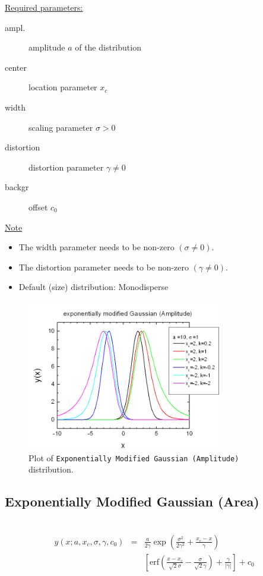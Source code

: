 \uline{Required parameters:}
\begin{description}
    \item[ampl.] amplitude $a$ of the distribution
    \item[center] location parameter $x_c$
    \item[width] scaling parameter $\sigma> 0$
    \item[distortion] distortion parameter $\gamma\neq 0$
    \item[backgr] offset $c_0$
\end{description}

\uline{Note}
\begin{itemize}
  \item The width parameter needs to be non-zero $(\sigma\neq 0)$.
  \item The distortion parameter needs to be non-zero $(\gamma \neq 0)$.
  \item Default (size) distribution: Monodisperse
\end{itemize}
\begin{figure}[htb]
\begin{center}
\includegraphics[width=0.768\textwidth]{EMGAmplitude.png}
\end{center}
\caption{Plot of \texttt{Exponentially Modified Gaussian (Amplitude)} distribution.}
\label{fig:EMGAmplitude}
\end{figure}

\clearpage
\subsection{Exponentially Modified Gaussian (Area)} ~\\
\label{sec:ExponentiallyModifiedGaussianArea}
\begin{eqnarray}
y(x;a,x_c,\sigma,\gamma,c_0) & = &
\frac{a}{2\gamma}
\exp\left(\frac{\sigma^2}{2\gamma^2}+\frac{x_c-x}{\gamma}\right) \nonumber \\
& & \left[\mathrm{erf}\left(\frac{x-x_c}{\sqrt{2}\sigma}-\frac{\sigma}{\sqrt{2}\gamma}\right)+\frac{\gamma}{| \gamma |}\right]
+c_0
\end{eqnarray}

